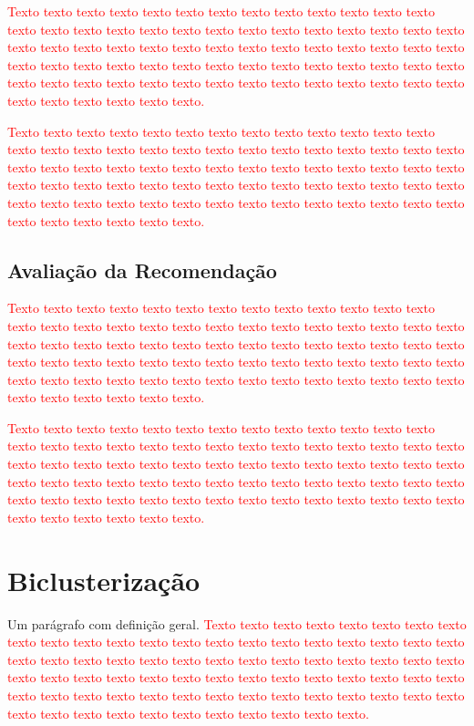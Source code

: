 \documentclass[normaltoc, espacoumemeio, pnumromarab,ruledheader]{abnt}
\begin{document}
\textcolor{red}{Texto texto texto texto texto texto texto texto texto texto texto texto texto texto texto texto texto texto texto texto texto texto texto texto texto texto texto texto texto texto texto texto texto texto texto texto texto texto texto texto texto texto texto texto texto texto texto texto texto texto texto texto texto texto texto texto texto texto texto texto texto texto texto texto texto texto texto texto texto texto texto texto texto texto texto.}

\textcolor{red}{Texto texto texto texto texto texto texto texto texto texto texto texto texto texto texto texto texto texto texto texto texto texto texto texto texto texto texto texto texto texto texto texto texto texto texto texto texto texto texto texto texto texto texto texto texto texto texto texto texto texto texto texto texto texto texto texto texto texto texto texto texto texto texto texto texto texto texto texto texto texto texto texto texto texto texto.}

 \subsection{Avaliação da Recomendação}

\textcolor{red}{Texto texto texto texto texto texto texto texto texto texto texto texto texto texto texto texto texto texto texto texto texto texto texto texto texto texto texto texto texto texto texto texto texto texto texto texto texto texto texto texto texto texto texto texto texto texto texto texto texto texto texto texto texto texto texto texto texto texto texto texto texto texto texto texto texto texto texto texto texto texto texto texto texto texto texto.}

\textcolor{red}{Texto texto texto texto texto texto texto texto texto texto texto texto texto texto texto texto texto texto texto texto texto texto texto texto texto texto texto texto texto texto texto texto texto texto texto texto texto texto texto texto texto texto texto texto texto texto texto texto texto texto texto texto texto texto texto texto texto texto texto texto texto texto texto texto texto texto texto texto texto texto texto texto texto texto texto.}

\section{Biclusterização}

Um parágrafo com definição geral. \textcolor{red}{Texto texto texto texto texto texto texto texto texto texto texto texto texto texto texto texto texto texto texto texto texto texto texto texto texto texto texto texto texto texto texto texto texto texto texto texto texto texto texto texto texto texto texto texto texto texto texto texto texto texto texto texto texto texto texto texto texto texto texto texto texto texto texto texto texto texto texto texto texto texto texto texto texto texto texto.}
\end{document}
